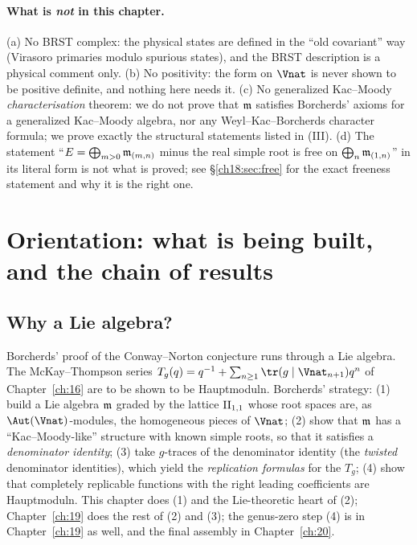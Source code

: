 \paragraph{What is \emph{not} in this chapter.}  (a) No BRST complex: the physical states are
defined in the ``old covariant'' way (Virasoro primaries modulo spurious states), and the BRST
description is a physical comment only.  (b) No positivity: the form on $\Vnat$ is never shown to be
positive definite, and nothing here needs it.  (c) No generalized Kac--Moody \emph{characterisation}
theorem: we do not prove that $\mathfrak{m}$ satisfies Borcherds' axioms for a generalized Kac--Moody
algebra, nor any Weyl--Kac--Borcherds character formula; we prove exactly the structural statements
listed in (III).  (d) The statement ``$E=\bigoplus_{m>0}\mathfrak{m}_{(m,n)}$ minus the real simple root
is free on $\bigoplus_n\mathfrak{m}_{(1,n)}$'' in its literal form is not what is proved; see
\S\ref{ch18:sec:free} for the exact freeness statement and why it is the right one.

\section{Orientation: what is being built, and the chain of results}\label{ch18:sec:intro}

\subsection{Why a Lie algebra?}

Borcherds' proof of the Conway--Norton conjecture runs through a Lie algebra.  The McKay--Thompson
series $T_g(q)=q^{-1}+\sum_{n\ge1}\tr(g\mid\Vnat_{n+1})q^n$ of Chapter~\ref{ch:16} are to be shown to be
Hauptmoduln.  Borcherds' strategy: (1) build a Lie algebra $\mathfrak{m}$ graded by the lattice
$\mathrm{II}_{1,1}$ whose root spaces are, as $\Aut(\Vnat)$-modules, the homogeneous pieces of $\Vnat$; (2)
show that $\mathfrak{m}$ has a ``Kac--Moody-like'' structure with known simple roots, so that it satisfies
a \emph{denominator identity}; (3) take $g$-traces of the denominator identity (the \emph{twisted}
denominator identities), which yield the \emph{replication formulas} for the $T_g$; (4) show that
completely replicable functions with the right leading coefficients are Hauptmoduln.  This chapter
does (1) and the Lie-theoretic heart of (2); Chapter~\ref{ch:19} does the rest of (2) and (3); the
genus-zero step (4) is in Chapter~\ref{ch:19} as well, and the final assembly in Chapter~\ref{ch:20}.

